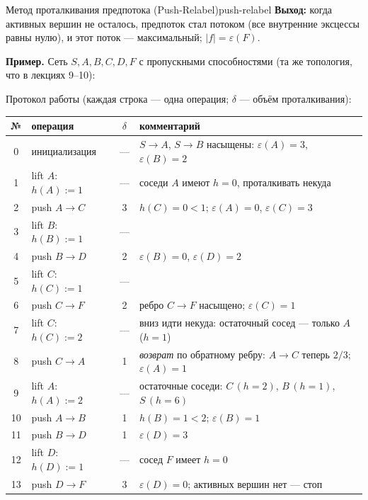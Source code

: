 \begin{algo}{Метод проталкивания предпотока (Push-Relabel)}{push-relabel}
\medskip
\textbf{Выход:} когда активных вершин не осталось, предпоток стал
потоком (все внутренние эксцессы равны нулю), и этот поток ---
максимальный; $|f| = \varepsilon(F)$.

\medskip
\noindent\textbf{Пример.} Сеть $S, A, B, C, D, F$ с пропускными
способностями (та же топология, что в лекциях 9--10):


\medskip
Протокол работы (каждая строка --- одна операция; $\delta$ --- объём
проталкивания):

\begin{center}
\small
\begin{tabular}{c|l|c|l}
№ & операция & $\delta$ & комментарий \\ \hline
0 & инициализация & --- & $S{\to}A$, $S{\to}B$ насыщены: $\varepsilon(A){=}3$, $\varepsilon(B){=}2$ \\
1 & lift $A$: $h(A){:=}1$ & --- & соседи $A$ имеют $h = 0$, проталкивать некуда \\
2 & push $A \to C$ & 3 & $h(C) = 0 < 1$; $\varepsilon(A){=}0$, $\varepsilon(C){=}3$ \\
3 & lift $B$: $h(B){:=}1$ & --- & \\
4 & push $B \to D$ & 2 & $\varepsilon(B){=}0$, $\varepsilon(D){=}2$ \\
5 & lift $C$: $h(C){:=}1$ & --- & \\
6 & push $C \to F$ & 2 & ребро $C{\to}F$ насыщено; $\varepsilon(C){=}1$ \\
7 & lift $C$: $h(C){:=}2$ & --- & вниз идти некуда: остаточный сосед --- только $A$ ($h{=}1$) \\
8 & push $C \to A$ & 1 & \emph{возврат} по обратному ребру: $A{\to}C$ теперь $2/3$; $\varepsilon(A){=}1$ \\
9 & lift $A$: $h(A){:=}2$ & --- & остаточные соседи: $C\,(h{=}2)$, $B\,(h{=}1)$, $S\,(h{=}6)$ \\
10 & push $A \to B$ & 1 & $h(B) = 1 < 2$; $\varepsilon(B){=}1$ \\
11 & push $B \to D$ & 1 & $\varepsilon(D){=}3$ \\
12 & lift $D$: $h(D){:=}1$ & --- & сосед $F$ имеет $h = 0$ \\
13 & push $D \to F$ & 3 & $\varepsilon(D){=}0$; активных вершин нет --- стоп \\
\end{tabular}
\end{center}


\end{algo}
